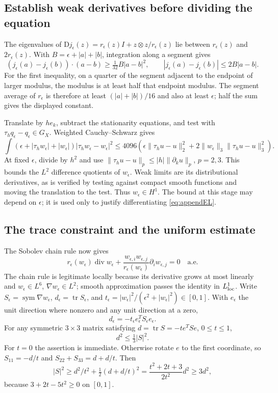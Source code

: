 \documentclass[11pt,a4paper]{article}
\theoremstyle{definition}\newtheorem{definition}[theorem]{Definition}
\theoremstyle{remark}\newtheorem{remark}[theorem]{Remark}
\newcommand{\norm}[1]{\lVert #1\rVert}
\newcommand{\diver}{\operatorname{div}}
\newcommand{\sym}{\operatorname{sym}}
\newcommand{\tr}{\operatorname{tr}}
\numberwithin{equation}{section}
\begin{document}
\subsection{Establish weak derivatives before dividing the equation}
The eigenvalues of $\mathrm Dj_\epsilon(z)=r_\epsilon(z)I+z\otimes z/r_\epsilon(z)$ lie between $r_\epsilon(z)$ and $2r_\epsilon(z)$. With $B=\epsilon+|a|+|b|$, integration along a segment gives
\[
 (j_\epsilon(a)-j_\epsilon(b))\cdot(a-b)\ge\tfrac1{32}B|a-b|^2,
 \qquad |j_\epsilon(a)-j_\epsilon(b)|\le2B|a-b|.
\]
For the first inequality, on a quarter of the segment adjacent to the endpoint of larger modulus, the modulus is at least half that endpoint modulus. The segment average of $r_\epsilon$ is therefore at least $(|a|+|b|)/16$ and also at least $\epsilon$; half the sum gives the displayed constant.

Translate by $he_k$, subtract the stationarity equations, and test with $\tau_hq_\epsilon-q_\epsilon\in G_X$. Weighted Cauchy--Schwarz gives
\begin{equation}\label{eq:appendDQ}
 \int(\epsilon+|\tau_hw_\epsilon|+|w_\epsilon|)
          |\tau_hw_\epsilon-w_\epsilon|^2
 \le4096\left(\epsilon\norm{\tau_hu-u}_2^2
       +2\norm{w_\epsilon}_3\norm{\tau_hu-u}_3^2\right).
\end{equation}
At fixed $\epsilon$, divide by $h^2$ and use
$\norm{\tau_hu-u}_p\le|h|\norm{\partial_ku}_p$, $p=2,3$. This bounds the $L^2$ difference quotients of $w_\epsilon$. Weak limits are its distributional derivatives, as is verified by testing against compact smooth functions and moving the translation to the test. Thus $w_\epsilon\in H^1$. The bound at this stage may depend on $\epsilon$; it is used only to justify differentiating \eqref{eq:appendEL}.

\subsection{The trace constraint and the uniform estimate}
The Sobolev chain rule now gives
\[
 r_\epsilon(w_\epsilon)\diver w_\epsilon
 +\frac{w_{\epsilon,i}w_{\epsilon,j}}{r_\epsilon(w_\epsilon)}
      \partial_iw_{\epsilon,j}=0\quad\text{a.e.}
\]
The chain rule is legitimate locally because its derivative grows at most linearly and $w_\epsilon\in L^6$, $\nabla w_\epsilon\in L^2$; smooth approximation passes the identity in $L^1_{\rm loc}$.
Write $S_\epsilon=\sym\nabla w_\epsilon$, $d_\epsilon=\tr S_\epsilon$, and
$t_\epsilon=|w_\epsilon|^2/(\epsilon^2+|w_\epsilon|^2)\in[0,1]$. With $e_\epsilon$ the unit direction where nonzero and any unit direction at a zero,
\[
 d_\epsilon=-t_\epsilon e_\epsilon^TS_\epsilon e_\epsilon.
\]
For any symmetric $3\times3$ matrix satisfying $d=\tr S=-te^TSe$, $0\le t\le1$,
\begin{equation}\label{eq:appendmatrix}
 d^2\le\tfrac13|S|^2.
\end{equation}
For $t=0$ the assertion is immediate. Otherwise rotate $e$ to the first coordinate, so $S_{11}=-d/t$ and $S_{22}+S_{33}=d+d/t$. Then
\[
 |S|^2\ge d^2/t^2+\tfrac12(d+d/t)^2
        =\frac{t^2+2t+3}{2t^2}d^2\ge3d^2,
\]
because $3+2t-5t^2\ge0$ on $[0,1]$.
\end{document}
